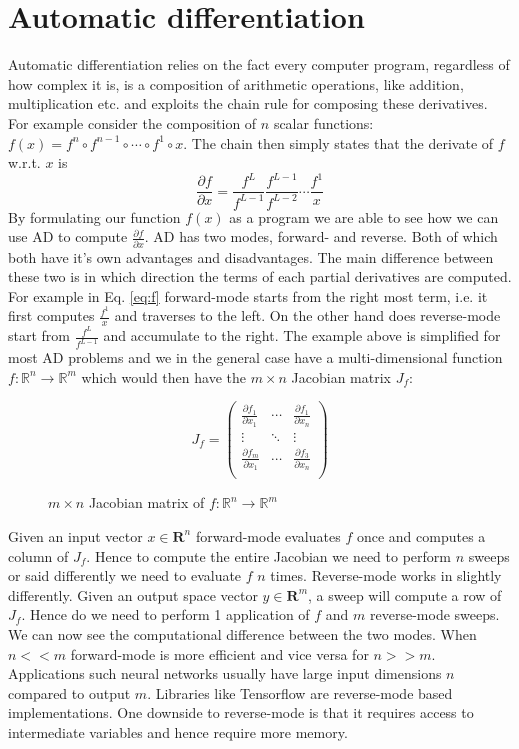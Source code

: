 \section{Automatic differentiation}
Automatic differentiation relies on the fact every computer program, regardless of how complex it is, 
is a composition of arithmetic operations, like addition, multiplication etc. and exploits the chain rule 
for composing these derivatives. For example consider the composition of $n$ scalar functions:
$f(x) = f^n \circ f^{n-1} \circ \cdots \circ f^1 \circ x$. The chain then simply states that the derivate of 
$f$ w.r.t. $x$ is 
\begin{equation}
\frac{\partial f}{\partial x} = \frac{f^L}{f^{L-1}} \frac{f^{L-1}}{f^{L-2}} \cdots \frac{f^1}{x}
\label{eq:f}
\end{equation}
By formulating our function $f(x)$ as a program we are able to see how we can 
use AD to compute $\frac{\partial f}{\partial x}$. AD has two modes, forward- and reverse. Both of which 
both have it's own advantages and disadvantages.  
The main difference between these two is in which direction the terms of each partial derivatives
are computed. For example in Eq. \ref{eq:f} forward-mode starts from the right most term, i.e. it first computes $\frac{f^1}{x}$
and traverses to the left. On the other hand does reverse-mode start from $\frac{f^L}{f^{L-1}}$ and accumulate to the right. \newline 
The example above is simplified for most AD problems and we in the general case 
have a multi-dimensional function $f : \mathbb{R}^n \to \mathbb{R}^m$  which would then have the $m\times n$  Jacobian matrix $J_f$:
\begin{figure}[H]
	$$ J_{f} = \left(\begin{matrix}
	\frac{\partial f_1}{\partial x_1} & \cdots & \frac{\partial f_1}{\partial x_n} \\
    \vdots & \ddots & \vdots \\
	\frac{\partial f_m}{\partial x_1} & \cdots  &  \frac{\partial f_3}{\partial x_n}\\
	\end{matrix}\right) $$
	\caption{$m\times n$ Jacobian matrix of $f : \mathbb{R}^n \to \mathbb{R}^m$}
\end{figure}
Given an input vector $x \in \mathbf{R}^n$  forward-mode evaluates $f$ once and computes a column of $J_f$. Hence to compute 
the entire Jacobian we need to perform $n$ sweeps or said differently we need to evaluate $f$ $n$ times. 
Reverse-mode works in slightly differently. Given an output space vector $y \in \mathbf{R}^m$, a sweep will compute a 
row of $J_f$. Hence do we need to perform 1 application of $f$ and $m$ reverse-mode sweeps.  We can now see the 
computational difference between the two modes. When $n << m$ forward-mode is more efficient and vice versa for $n >> m$. 
Applications such neural networks usually have large input dimensions $n$ compared to output $m$. 
Libraries like Tensorflow are reverse-mode based implementations. One downside to reverse-mode is that 
it requires access to intermediate variables and hence require more memory. 


